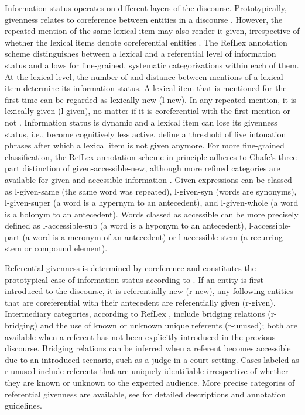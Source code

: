 Information status operates on different layers of the discourse. Prototypically, givenness relates to coreference between entities in a discourse \citep[18]{buringIntonationMeaning2016}. However, the repeated mention of the same lexical item may also render it given, irrespective of whether the lexical items denote coreferential entities \citep{baumannReferentialLexicalGivenness2012}. The RefLex annotation scheme \citep{riesterRefLexSchemeAnnotation2017} distinguishes between a lexical and a referential level of information status and allows for fine-grained, systematic categorizations within each of them. At the lexical level, the number of and distance between mentions of a lexical item determine its information status. A lexical item that is mentioned for the first time can be regarded as lexically new (l-new). In any repeated mention, it is lexically given (l-given), no matter if it is coreferential with the first mention or not \citep{baumannCoreferenceLexicalGivenness2013}. Information status is dynamic and a lexical item can lose its givenness status, i.e., become cognitively less active. \citet[24]{baumannCoreferenceLexicalGivenness2013} define a threshold of five intonation phrases after which a lexical item is not given anymore. For more fine-grained classification, the RefLex annotation scheme in principle adheres to Chafe's \citeyearpar{chafeDiscourseConsciousnessTime1994} three-part distinction of given-accessible-new, although more refined categories are available for given and accessible information \citep{riesterRefLexSchemeAnnotation2017}. Given expressions can be classed as l-given-same (the same word was repeated), l-given-syn (words are synonyms), l-given-super (a word is a hypernym to an antecedent), and l-given-whole (a word is a holonym to an antecedent). Words classed as accessible can be more precisely defined as l-accessible-sub (a word is a hyponym to an antecedent), l-accessible-part (a word is a meronym of an antecedent) or l-accessible-stem (a recurring stem or compound element).

Referential givenness is determined by coreference and constitutes the prototypical case of information status according to \citet{buringIntonationMeaning2016}. If an entity is first introduced to the discourse, it is referentially new (r-new), any following entities that are coreferential with their antecedent are referentially given (r-given). Intermediary categories, according to RefLex \citep{riesterRefLexSchemeAnnotation2017}, include bridging relations (r-bridging) and the use of known or unknown unique referents (r-unused); both are available when a referent has not been explicitly introduced in the previous discourse. Bridging relations can be inferred when a referent becomes accessible due to an introduced scenario, such as a judge in a court setting. Cases labeled as r-unused include referents that are uniquely identifiable irrespective of whether they are known or unknown to the expected audience. More precise categories of referential givenness are available, see \citet{riesterRefLexSchemeAnnotation2017} for detailed descriptions and annotation guidelines.

